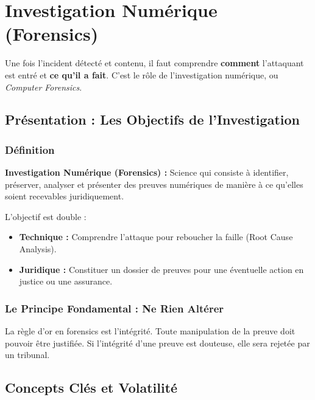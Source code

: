 \chapter{Investigation Numérique (Forensics)}
\label{chap:forensics}

Une fois l'incident détecté et contenu, il faut comprendre \textbf{comment} l'attaquant est entré et \textbf{ce qu'il a fait}. C'est le rôle de l'investigation numérique, ou \textit{Computer Forensics}.

\section{Présentation : Les Objectifs de l'Investigation}

\subsection{Définition}

\begin{boxdef}
\textbf{Investigation Numérique (Forensics) :} Science qui consiste à identifier, préserver, analyser et présenter des preuves numériques de manière à ce qu'elles soient recevables juridiquement.
\end{boxdef}

L'objectif est double :
\begin{itemize}
    \item \textbf{Technique :} Comprendre l'attaque pour reboucher la faille (Root Cause Analysis).
    \item \textbf{Juridique :} Constituer un dossier de preuves pour une éventuelle action en justice ou une assurance.
\end{itemize}

\subsection{Le Principe Fondamental : Ne Rien Altérer}

La règle d'or en forensics est l'intégrité. Toute manipulation de la preuve doit pouvoir être justifiée. Si l'intégrité d'une preuve est douteuse, elle sera rejetée par un tribunal.

\section{Concepts Clés et Volatilité}

